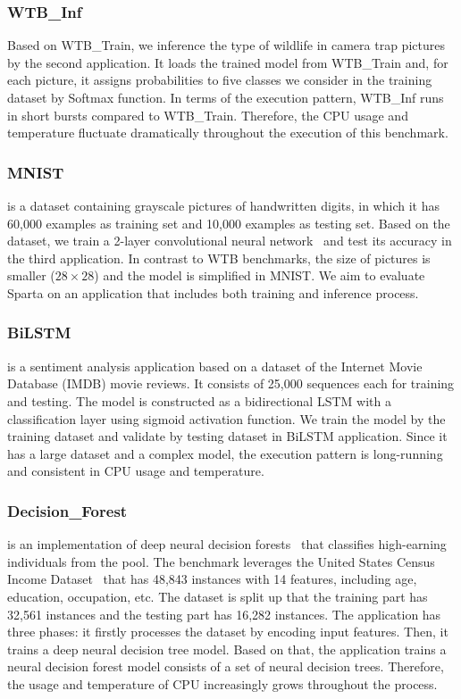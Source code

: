\subsubsection{WTB\_Inf}

Based on WTB\_Train, we inference the type of wildlife in camera trap pictures by the second application. It loads the trained model from WTB\_Train and, for each picture, it assigns probabilities to five classes we consider in the training dataset by Softmax function. In terms of the execution pattern, WTB\_Inf runs in short bursts compared to WTB\_Train. Therefore, the CPU usage and temperature fluctuate dramatically throughout the execution of this benchmark.

\subsubsection{MNIST}

 is a dataset containing grayscale pictures of handwritten digits, in which it has 60,000 examples as training set and 10,000 examples as testing set. Based on the dataset, we train a 2-layer convolutional neural network~\cite{ref:MNIST} and test its accuracy in the third application. In contrast to WTB benchmarks, the size of pictures is smaller ($28 \times 28$) and the model is simplified in MNIST. We aim to evaluate Sparta on an application that includes both training and inference process. 

\subsubsection{BiLSTM} is a sentiment analysis application based on a dataset of the Internet Movie Database (IMDB) movie reviews. It consists of 25,000 sequences each for training and testing. The model is constructed as a bidirectional LSTM with a classification layer using sigmoid activation function. We train the model by the training dataset and validate by testing dataset in BiLSTM application. Since it has a large dataset and a complex model, the execution pattern is long-running and consistent in CPU usage and temperature.


\subsubsection{Decision\_Forest} is an implementation of deep neural decision forests~\cite{ref:decision_forest} that classifies high-earning individuals from the pool. The benchmark leverages the United States Census Income Dataset~\cite{ref:uci} that has 48,843 instances with 14 features, including age, education, occupation, etc. The dataset is split up that the training part has 32,561 instances and the testing part has 16,282 instances. The application has three phases: it firstly processes the dataset by encoding input features. Then, it trains a deep neural decision tree model. Based on that, the application trains a neural decision forest model consists of a set of neural decision trees. Therefore, the usage and temperature of CPU increasingly grows throughout the process.



